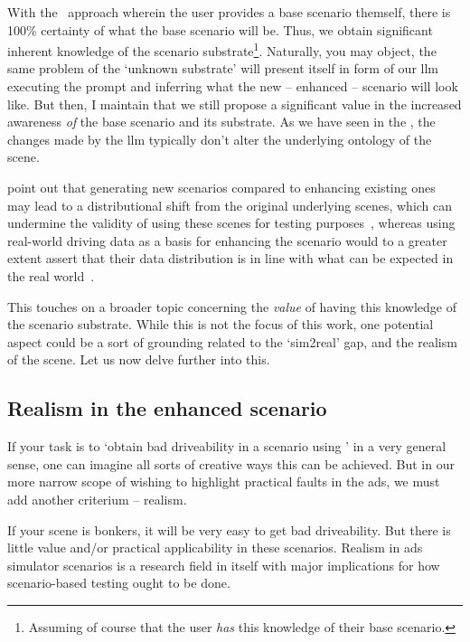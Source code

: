 With the \hefe~approach wherein the user provides a base scenario themself, there is \num{100}\%
certainty of what the base scenario will be. Thus, we obtain significant inherent knowledge of the
scenario substrate\footnote{Assuming of course that the user \emph{has} this knowledge of their base
    scenario.}. Naturally, you may object, the same problem of the `unknown substrate' will present
itself in form of our \acrshort{llm} executing the prompt and inferring what the new -- enhanced --
scenario will look like. But then, I maintain that we still propose a significant value in the
increased awareness \emph{of} the base scenario and its substrate. As we have seen in the
, the changes made by the \acrshort{llm} typically don't alter the underlying
ontology of the scene.

\citeauthor{yao2025agentsllm} point out that generating new scenarios compared to enhancing existing
ones may lead to a distributional shift from the original underlying scenes, which can undermine the
validity of using these scenes for testing purposes~\cite[1]{yao2025agentsllm}, whereas using
real-world driving data as a basis for enhancing the scenario would to a greater extent assert that
their data distribution is in line with what can be expected in the real world~\cite[2]{yao2025agentsllm}.

This touches on a broader topic concerning the \emph{value} of having this knowledge of the
scenario substrate. While this is not the focus of this work, one potential aspect could be a sort
of grounding related to the `sim2real' gap, and the realism of the scene. Let us now delve further
into this.

\subsection{Realism in the enhanced scenario}

If your task is to `obtain bad driveability in a scenario using ' in a very general
sense, one can imagine all sorts of creative ways this can be achieved. But in our more narrow scope
of wishing to highlight practical faults in the \acrshort{ads}, we must add another criterium --
realism.

If your scene is bonkers, it will be very easy to get bad driveability. But there is little value
and/or practical applicability in these scenarios. Realism in \acrshort{ads} simulator scenarios is
a research field in itself with major implications for how scenario-based testing ought to be done.

